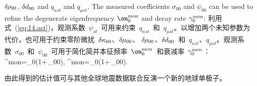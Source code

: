 \enlargethispage{-0.5\baselineskip}
$\delta\hspace{-0.2 mm}\rho_{00}$, $\delta\hspace{-0.1 mm}d_{00}$
and $q_{\kappa st}$ and $q_{\mu st}$.  The measured coefficients
$\sigma_{00}$ and $\psi_{00}$ can be used to refine the degenerate
eigenfrequency $\om^{\rm mon}_0$ and decay rate $\gamma^{\rm mon}_0$:
\fi
利用式~(\ref{eq:14.ast})，观测系数~$\psi_{st}$~可用来约束~$q_{{\kappa}st}$~和~$q_{{\mu}st}$。以增加两个未知参数为代价，也可用于约束零阶微扰~$\delta\hspace{-0.1 mm}\kappa_{00}$、$\delta\hspace{-0.2 mm}\mu_{00}$、\enlargethispage{-0.5\baselineskip}
$\delta\hspace{-0.2 mm}\rho_{00}$、$\delta\hspace{-0.1 mm}d_{00}$~和~$q_{\kappa st}$、$q_{\mu st}$。观测系数~$\sigma_{00}$~和~$\psi_{00}$~可用于简化简并本征频率~$\om^{\rm mon}_0$~和衰减率~$\gamma^{\rm mon}_0$：
\eq
\om^{\rm mon}=\om_0\left(1+\sqrt{4\pi}\,\sigma_{00}\right),
\qquad
\gamma^{\rm mon}=\gamma_0\left(1+\sqrt{4\pi}\,\psi_{00}\right).
\en

由此得到的估计值可与其他全球地震数据联合反演一个新的地球单极子。
